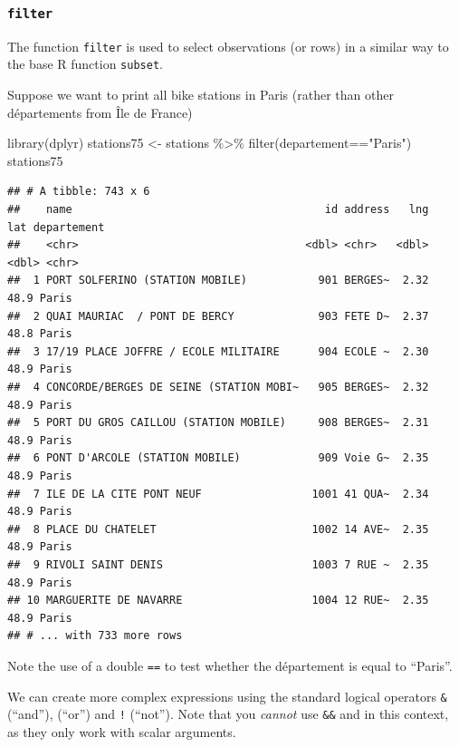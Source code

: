 \documentclass[
]{book}
\newenvironment{Shaded}{\begin{snugshade}}{\end{snugshade}}
\newcommand{\FunctionTok}[1]{\textcolor[rgb]{0.00,0.00,0.00}{#1}}
\newcommand{\NormalTok}[1]{#1}
\newcommand{\OtherTok}[1]{\textcolor[rgb]{0.56,0.35,0.01}{#1}}
\newcommand{\SpecialCharTok}[1]{\textcolor[rgb]{0.00,0.00,0.00}{#1}}
\newcommand{\StringTok}[1]{\textcolor[rgb]{0.31,0.60,0.02}{#1}}
\begin{document}
\hypertarget{filter}{%
\subsubsection{\texorpdfstring{\texttt{filter}}{filter}}\label{filter}}

The function \texttt{filter} is used to select observations (or rows) in a similar way to the base R function \texttt{subset}.

Suppose we want to print all bike stations in Paris (rather than other départements from Île de France)

\begin{Shaded}
\begin{Highlighting}[]
\FunctionTok{library}\NormalTok{(dplyr)}
\NormalTok{stations75 }\OtherTok{\textless{}{-}}\NormalTok{ stations }\SpecialCharTok{\%\textgreater{}\%}
                \FunctionTok{filter}\NormalTok{(departement}\SpecialCharTok{==}\StringTok{"Paris"}\NormalTok{)}
\NormalTok{stations75}
\end{Highlighting}
\end{Shaded}

\begin{verbatim}
## # A tibble: 743 x 6
##    name                                       id address   lng   lat departement
##    <chr>                                   <dbl> <chr>   <dbl> <dbl> <chr>      
##  1 PORT SOLFERINO (STATION MOBILE)           901 BERGES~  2.32  48.9 Paris      
##  2 QUAI MAURIAC  / PONT DE BERCY             903 FETE D~  2.37  48.8 Paris      
##  3 17/19 PLACE JOFFRE / ECOLE MILITAIRE      904 ECOLE ~  2.30  48.9 Paris      
##  4 CONCORDE/BERGES DE SEINE (STATION MOBI~   905 BERGES~  2.32  48.9 Paris      
##  5 PORT DU GROS CAILLOU (STATION MOBILE)     908 BERGES~  2.31  48.9 Paris      
##  6 PONT D'ARCOLE (STATION MOBILE)            909 Voie G~  2.35  48.9 Paris      
##  7 ILE DE LA CITE PONT NEUF                 1001 41 QUA~  2.34  48.9 Paris      
##  8 PLACE DU CHATELET                        1002 14 AVE~  2.35  48.9 Paris      
##  9 RIVOLI SAINT DENIS                       1003 7 RUE ~  2.35  48.9 Paris      
## 10 MARGUERITE DE NAVARRE                    1004 12 RUE~  2.35  48.9 Paris      
## # ... with 733 more rows
\end{verbatim}

Note the use of a double \texttt{==} to test whether the département is equal to ``Paris''.

We can create more complex expressions using the standard logical operators \texttt{\&} (``and''), \texttt{\textbar{}} (``or'') and \texttt{!} (``not''). Note that you \emph{cannot} use \texttt{\&\&} and \texttt{\textbar{}\textbar{}} in this context, as they only work with scalar arguments.
\end{document}
